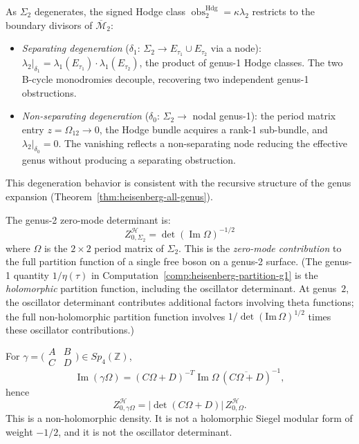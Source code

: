 \begin{remark}\label{rem:genus2-degeneration}
As $\Sigma_2$ degenerates, the signed Hodge class
$\operatorname{obs}^{\mathrm{Hdg}}_2=\kappa\lambda_2$ restricts to the
boundary divisors of $\overline{\mathcal{M}}_2$:
\begin{itemize}
\item \emph{Separating degeneration}
 ($\delta_1$: $\Sigma_2 \to E_{\tau_1} \cup E_{\tau_2}$
 via a node):
 $\lambda_2|_{\delta_1}
 = \lambda_1(E_{\tau_1}) \cdot \lambda_1(E_{\tau_2})$,
 the product of genus-1 Hodge classes. The two B-cycle
 monodromies decouple, recovering two independent
 genus-1 obstructions.
\item \emph{Non-separating degeneration}
 ($\delta_0$: $\Sigma_2 \to$ nodal genus-1): the period
 matrix entry $z = \Omega_{12} \to 0$, the Hodge bundle
 acquires a rank-1 sub-bundle, and
 $\lambda_2|_{\delta_0} = 0$. The vanishing reflects
 a non-separating node reducing the
 effective genus without producing a separating
 obstruction.
\end{itemize}
This degeneration behavior is consistent with the recursive
structure of the genus expansion
(Theorem~\ref{thm:heisenberg-all-genus}).
\end{remark}

\begin{computation}\label{comp:partition-genus-two}
The genus-2 zero-mode determinant is:
\begin{equation}
Z_{0,\Sigma_2}^{\mathcal{H}}
= \det(\operatorname{Im}\Omega)^{-1/2}
\end{equation}
where $\Omega$ is the $2 \times 2$ period matrix of $\Sigma_2$.
This is the \emph{zero-mode contribution} to the full partition
function of a single free boson on a genus-2 surface.
(The genus-1 quantity $1/\eta(\tau)$ in
Computation~\ref{comp:heisenberg-partition-g1} is the
\emph{holomorphic} partition function, including the oscillator
determinant. At genus~$2$, the oscillator determinant contributes
additional factors involving theta functions; the full
non-holomorphic partition function involves
$1/\det(\mathrm{Im}\,\Omega)^{1/2}$ times these oscillator
contributions.)

For $\gamma=\bigl(\begin{smallmatrix}A&B\\ C&D\end{smallmatrix}\bigr)
\in Sp_4(\mathbb Z)$,
\[
\operatorname{Im}(\gamma\Omega)
=(C\Omega+D)^{-T}\operatorname{Im}\Omega\,
(\overline{C\Omega+D})^{-1},
\]
hence
\[
Z_{0,\gamma\Omega}^{\mathcal H}
=|\det(C\Omega+D)|\,Z_{0,\Omega}^{\mathcal H}.
\]
This is a non-holomorphic density. It is not a holomorphic Siegel
modular form of weight $-1/2$, and it is not the oscillator
determinant.
\end{computation}

